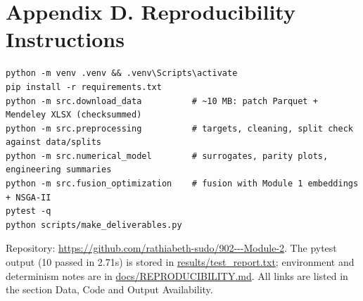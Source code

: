 \documentclass[11pt,a4paper]{article}
\begin{document}
\section*{Appendix D. Reproducibility Instructions}
\begin{verbatim}
python -m venv .venv && .venv\Scripts\activate
pip install -r requirements.txt
python -m src.download_data          # ~10 MB: patch Parquet + Mendeley XLSX (checksummed)
python -m src.preprocessing          # targets, cleaning, split check against data/splits
python -m src.numerical_model        # surrogates, parity plots, engineering summaries
python -m src.fusion_optimization    # fusion with Module 1 embeddings + NSGA-II
pytest -q
python scripts/make_deliverables.py
\end{verbatim}
Repository: \url{https://github.com/rathiabeth-sudo/902---Module-2}. The pytest output (10 passed in 2.71s) is stored in \href{https://github.com/rathiabeth-sudo/902---Module-2/blob/main/results/test_report.txt}{results/test\_report.txt}; environment and determinism notes are in \href{https://github.com/rathiabeth-sudo/902---Module-2/blob/main/docs/REPRODUCIBILITY.md}{docs/REPRODUCIBILITY.md}. All links are listed in the section Data, Code and Output Availability.
\end{document}
